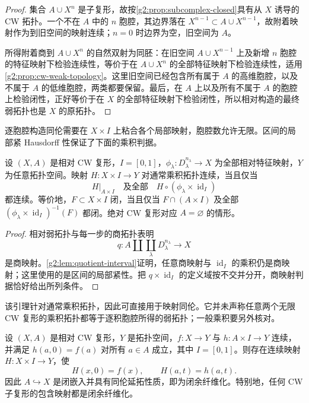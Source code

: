 \begin{proof}
	集合 \(A\cup X^n\) 是子复形，故按\cref{g2:prop:subcomplex-closed}具有从 \(X\) 诱导的 CW 拓扑。一个不在 \(A\) 中的 \(n\) 胞腔，其边界落在 \(X^{n-1}\subset A\cup X^{n-1}\)，故附着映射作为到旧空间的映射连续；\(n=0\) 时边界为空，旧空间为 \(A\)。

	所得附着商到 \(A\cup X^n\) 的自然双射为同胚：在旧空间 \(A\cup X^{n-1}\) 上及新增 \(n\) 胞腔的特征映射下检验连续性，等价于在 \(A\cup X^n\) 的全部特征映射下检验连续性，适用\cref{g2:prop:cw-weak-topology}。这里旧空间已经包含所有属于 \(A\) 的高维胞腔，以及不属于 \(A\) 的低维胞腔，两类都要保留。最后，在 \(A\) 上以及所有不属于 \(A\) 的胞腔上检验闭性，正好等价于在 \(X\) 的全部特征映射下检验闭性，所以相对构造的最终弱拓扑也是 \(X\) 的原拓扑。
\end{proof}

逐胞腔构造同伦需要在 \(X\times I\) 上粘合各个局部映射，胞腔数允许无限。区间的局部紧 Hausdorff 性保证了下面的乘积判据。

\begin{lemma}
	\label{g2:lem:weak-product}
	设 \((X,A)\) 是相对 CW 复形，\(I=[0,1]\)，\(\phi_\lambda:D^{n_\lambda}_\lambda\to X\) 为全部相对特征映射，\(Y\) 为任意拓扑空间。映射 \(H:X\times I\to Y\) 对通常乘积拓扑连续，当且仅当
	\[
		H|_{A\times I}\quad\text{及全部}\quad H\circ(\phi_\lambda\times\operatorname{id}_I)
	\]
	都连续。等价地，\(F\subset X\times I\) 闭，当且仅当 \(F\cap(A\times I)\) 及全部 \((\phi_\lambda\times\operatorname{id}_I)^{-1}(F)\) 都闭。绝对 CW 复形对应 \(A=\varnothing\) 的情形。
\end{lemma}

\begin{proof}
	相对弱拓扑与每一步的商拓扑表明
	\[
		q:A\amalg\coprod_\lambda D^{n_\lambda}_\lambda\longrightarrow X
	\]
	是商映射。\cref{g2:lem:quotient-interval}证明，任意商映射与 \(\operatorname{id}_I\) 的乘积仍是商映射；这里使用的是区间的局部紧性。把 \(q\times\operatorname{id}_I\) 的定义域按不交并分开，商映射判据恰好给出所列条件。
\end{proof}

该引理针对通常乘积拓扑，因此可直接用于映射同伦。它并未声称任意两个无限 CW 复形的乘积拓扑都等于逐积胞腔所得的弱拓扑；一般乘积要另外核对。

\begin{theorem}
	\label{g2:thm:relative-CW-HEP}
	设 \((X,A)\) 是相对 CW 复形，\(Y\) 是拓扑空间，\(f:X\to Y\) 与 \(h:A\times I\to Y\) 连续，并满足 \(h(a,0)=f(a)\) 对所有 \(a\in A\) 成立，其中 \(I=[0,1]\)。则存在连续映射 \(H:X\times I\to Y\)，使
	\[
		H(x,0)=f(x),\qquad H(a,t)=h(a,t).
	\]
	因此 \(A\hookrightarrow X\) 是闭嵌入并具有同伦延拓性质，即为闭余纤维化。特别地，任何 CW 子复形的包含映射都是闭余纤维化。
\end{theorem}

